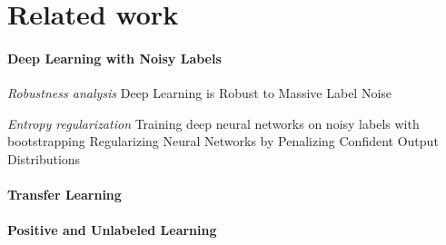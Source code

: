 \section{Related work}
\label{related}


\paragraph{{Deep Learning with Noisy Labels}}

\textit{Robustness analysis}
Deep Learning is Robust to Massive Label Noise \cite{rolnick2017deep}

\textit{Entropy regularization}
Training deep neural networks on noisy labels with bootstrapping \cite{reed2014training}
Regularizing Neural Networks by Penalizing Confident Output Distributions \cite{pereyra2017regularizing}

\paragraph{Transfer Learning}

\paragraph{Positive and Unlabeled Learning}
